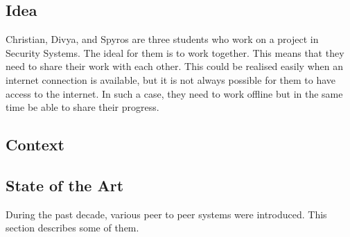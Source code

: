 
\subsection{Idea}

Christian, Divya, and Spyros are three students who work on a project in Security Systems. The ideal for them is to work together. This means that they need to share their work with each other. This could be realised easily when an internet connection is available, but it is not always possible for them to have access to the internet. In such a case, they need to work offline but in the same time be able to share their progress.

\subsection{Context}

\subsection{State of the Art}

During the past decade, various peer to peer systems were introduced. This section describes some of them.


